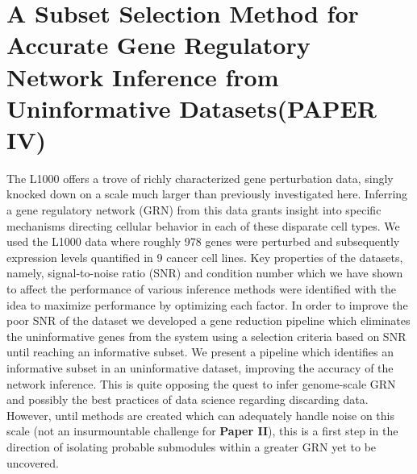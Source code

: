 

\section{A Subset Selection Method for Accurate Gene Regulatory Network Inference from Uninformative Datasets(PAPER IV)}

The L1000 offers a trove of richly characterized gene perturbation data, singly knocked down on a scale much larger than previously investigated here. Inferring a gene regulatory network (GRN) from this data grants insight into specific mechanisms directing cellular behavior in each of these disparate cell types. We used the L1000 data where roughly 978 genes were perturbed and subsequently expression levels quantified in 9 cancer cell lines. Key properties of the datasets, namely, signal-to-noise ratio (SNR) and condition number which we have shown to affect the performance of various inference methods were identified with the idea to maximize performance by optimizing each factor. 
In order to improve the poor SNR of the dataset we developed a gene reduction pipeline which eliminates the uninformative genes from the system using a selection criteria based on SNR until reaching an informative subset. We present a pipeline which identifies an informative subset in an uninformative dataset, improving the accuracy of the network inference.
This is quite opposing the quest to infer genome-scale GRN and possibly the best practices of data science regarding discarding data. However, until methods are created which can adequately handle noise on this scale (not an insurmountable challenge for \textbf{Paper II}), this is a first step in the direction of isolating probable submodules within a greater GRN yet to be uncovered.